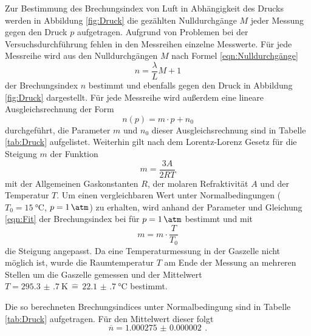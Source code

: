 Zur Bestimmung des Brechungsindex von Luft in Abhängigkeit des Drucks werden in Abbildung \ref{fig:Druck} die gezählten Nulldurchgänge $M$ jeder Messung gegen den Druck $p$ aufgetragen. Aufgrund von Problemen bei der Versuchsdurchführung fehlen in den Messreihen einzelne Messwerte. Für jede Messreihe wird aus den Nulldurchgängen $M$ nach Formel \ref{eqn:Nulldurchgänge}
\begin{equation}
   n = \frac{\lambda}{L} M + 1
   \label{eqn:Nulldurchgänge}
\end{equation}
der Brechungsindex $n$ bestimmt und ebenfalls gegen den Druck in Abbildung \ref{fig:Druck} dargestellt. Für jede Messreihe wird außerdem eine lineare Ausgleichsrechnung der Form
\begin{equation}
  n(p) = m \cdot p + n_0
  \label{eqn:Fit}
\end{equation}
durchgeführt, die Parameter $m$ und $n_0$ dieser Ausgleichsrechnung sind in Tabelle \ref{tab:Druck} aufgelistet.
Weiterhin gilt nach dem Lorentz-Lorenz Gesetz für die Steigung $m$ der Funktion
\begin{equation*}
  m = \frac{3 A}{2 R T}
\end{equation*}
mit der Allgemeinen Gaskonstanten $R$, der molaren Refraktivität $A$ und der Temperatur $T$.
Um einen vergleichbaren Wert unter Normalbedingungen ($T_0 = \SI{15}{\degreeCelsius}$, $p=\SI{1}{\atm}$) zu erhalten, wird anhand der Parameter und Gleichung \eqref{eqn:Fit} der Brechungsindex bei für $p=\SI{1}{\atm}$ bestimmt und mit
\begin{equation*}
  m = m \cdot \frac{T}{T_0}
\end{equation*}
die Steigung angepasst. Da eine Temperaturmessung in der Gaszelle nicht möglich ist, wurde die Raumtemperatur $T$ am Ende der Messung an mehreren Stellen um die Gaszelle gemessen und der Mittelwert $T = \SI{295.3(7)}{\kelvin}\, \widehat{=}\, \SI{22.1(7)}{\degreeCelsius}$ bestimmt. 

Die so berechneten Brechungsindices unter Normalbedingung sind in Tabelle \ref{tab:Druck} aufgetragen.
Für den Mittelwert dieser folgt
\begin{equation}
  \overline{n} = \SI{1.000275(2)}{} \,.
  \label{eqn:n_exp}
\end{equation}


